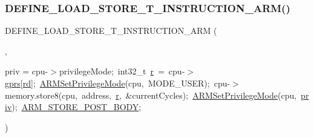 \subsubsection{\texorpdfstring{D\+E\+F\+I\+N\+E\+\_\+\+L\+O\+A\+D\+\_\+\+S\+T\+O\+R\+E\+\_\+\+T\+\_\+\+I\+N\+S\+T\+R\+U\+C\+T\+I\+O\+N\+\_\+\+A\+R\+M()}{DEFINE\_LOAD\_STORE\_T\_INSTRUCTION\_ARM()}\hspace{0.1cm}{\footnotesize\ttfamily [2/2]}}
{\footnotesize\ttfamily D\+E\+F\+I\+N\+E\+\_\+\+L\+O\+A\+D\+\_\+\+S\+T\+O\+R\+E\+\_\+\+T\+\_\+\+I\+N\+S\+T\+R\+U\+C\+T\+I\+O\+N\+\_\+\+A\+RM (\begin{DoxyParamCaption}\item[{S\+T\+R\+BT}]{,  }\item[{enum Privilege\+Mode}]{priv = {\ttfamily cpu-\/$>$privilegeMode;~int32\+\_\+t~\mbox{\hyperlink{isa-arm_8c_ad0156306be8fa0a12414e0da384f986a}{r}}~=~cpu-\/$>$\mbox{\hyperlink{isa-thumb_8c_a6b4b7e13a9a144391615b217c5917bc7}{gprs}}\mbox{[}\mbox{\hyperlink{isa-arm_8c_a555541ce18ed9b5fad657a06b22cb465}{rd}}\mbox{]};~\mbox{\hyperlink{isa-arm_8c_ac85f42234737e9423c66613a87824701}{A\+R\+M\+Set\+Privilege\+Mode}}(cpu,~MODE\+\_\+USER);~cpu-\/$>$memory.store8(cpu,~address,~\mbox{\hyperlink{isa-arm_8c_ad0156306be8fa0a12414e0da384f986a}{r}},~\&currentCycles);~\mbox{\hyperlink{isa-arm_8c_ac85f42234737e9423c66613a87824701}{A\+R\+M\+Set\+Privilege\+Mode}}(cpu,~\mbox{\hyperlink{isa-arm_8c_a0aeea5daab02e6ee74a9948da77a56e5}{priv}});~\mbox{\hyperlink{isa-arm_8c_ad6ad70baff6f5aa9c5f45e0a59623592}{A\+R\+M\+\_\+\+S\+T\+O\+R\+E\+\_\+\+P\+O\+S\+T\+\_\+\+B\+O\+DY}};} }\end{DoxyParamCaption})}

\mbox{\label{isa-arm_8c_a03ecb8cbe78058f48ec8aab8af8ec79c}} 
